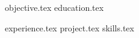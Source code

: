 \documentclass[11pt, a4paper]{awesome-cv}
\newcommand*{\sectiondir}{resume/}
\begin{document}
\makecvheader


{objective.tex}
{education.tex}

{experience.tex}
{project.tex}
{skills.tex}
\end{document}
